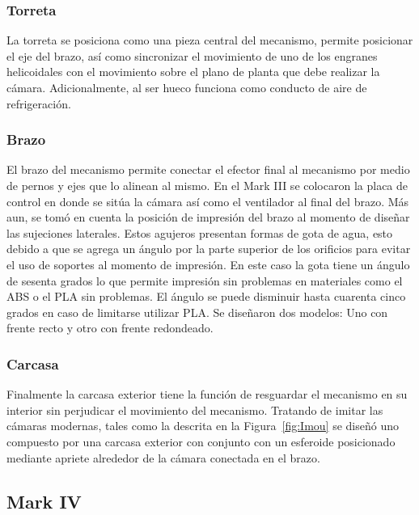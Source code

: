     \subsubsection{Torreta}
    La torreta se posiciona como una pieza central del mecanismo, permite posicionar el eje del brazo, así como sincronizar el movimiento de uno de los engranes helicoidales con el movimiento sobre el plano de planta que debe realizar la cámara. Adicionalmente, al ser hueco funciona como conducto de aire de refrigeración.
    
    \subsubsection{Brazo}
    El brazo del mecanismo permite conectar el efector final al mecanismo por medio de pernos y ejes que lo alinean al mismo. En el Mark III se colocaron la placa de control en donde se sitúa la cámara así como el ventilador al final del brazo. Más aun, se tomó en cuenta la posición de impresión del brazo al momento de diseñar las sujeciones laterales. Estos agujeros presentan formas de gota de agua, esto debido a que se agrega un ángulo por la parte superior de los orificios para evitar el uso de soportes al momento de impresión. En este caso la gota tiene un ángulo de sesenta grados lo que permite impresión sin problemas en materiales como el ABS o el PLA sin problemas. El ángulo se puede disminuir hasta cuarenta  cinco grados en caso de limitarse utilizar PLA.
    Se diseñaron dos modelos: Uno con frente recto y otro con frente redondeado.
    
    \subsubsection{Carcasa}
    Finalmente la carcasa exterior tiene la función de resguardar el mecanismo en su interior sin perjudicar el movimiento del mecanismo. Tratando de imitar las cámaras modernas, tales como la descrita en la Figura~\ref{fig:Imou} se diseñó uno compuesto por una carcasa exterior con conjunto con un esferoide posicionado mediante apriete alrededor de la cámara conectada en el brazo. 

    \needspace{6cm}
    \subsection{Mark IV}

